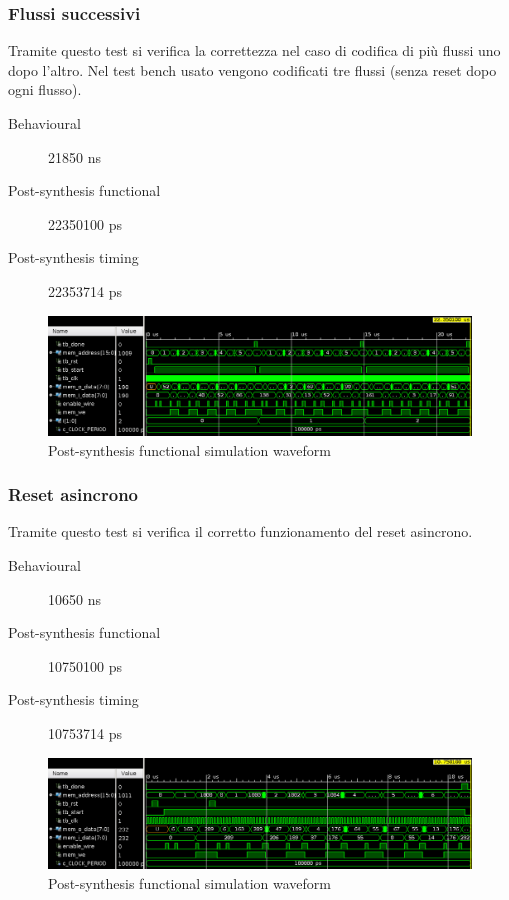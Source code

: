 \documentclass{article}
\begin{document}
\subsubsection{Flussi successivi}
Tramite questo test si verifica la correttezza  nel caso di codifica di più flussi uno dopo l'altro. Nel test bench usato vengono codificati tre flussi (senza reset dopo ogni flusso).
\begin{description}
	\item[Behavioural] 21850 ns
	\item[Post-synthesis functional] 22350100 ps
	\item[Post-synthesis timing] 22353714 ps
\end{description}
\begin{figure}[H]
	\centering
	\includegraphics[width=1\textwidth]{assets/tb1.png}
	\caption{Post-synthesis functional simulation waveform}
\end{figure}

\subsubsection{Reset asincrono}
Tramite questo test si verifica il corretto funzionamento del reset asincrono.
\begin{description}
	\item[Behavioural] 10650 ns
	\item[Post-synthesis functional] 10750100 ps
	\item[Post-synthesis timing] 10753714 ps
\end{description}
\begin{figure}[!htb]
	\centering
	\includegraphics[width=1\textwidth]{assets/tb2.png}
	\caption{Post-synthesis functional simulation waveform}
\end{figure}
\end{document}
